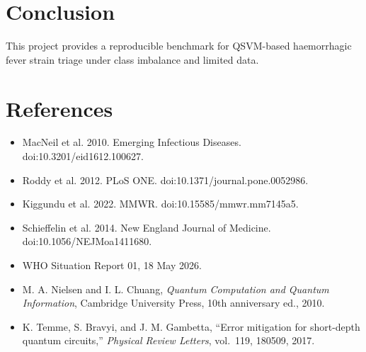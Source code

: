 \documentclass[11pt]{article}
\begin{document}
\section{Conclusion}
This project provides a reproducible benchmark for QSVM-based haemorrhagic fever strain triage under class imbalance and limited data.

\section*{References}
\begin{itemize}
\item MacNeil et al. 2010. Emerging Infectious Diseases. doi:10.3201/eid1612.100627.
\item Roddy et al. 2012. PLoS ONE. doi:10.1371/journal.pone.0052986.
\item Kiggundu et al. 2022. MMWR. doi:10.15585/mmwr.mm7145a5.
\item Schieffelin et al. 2014. New England Journal of Medicine. doi:10.1056/NEJMoa1411680.
\item WHO Situation Report 01, 18 May 2026.
\item M. A. Nielsen and I. L. Chuang, \emph{Quantum Computation and Quantum Information}, Cambridge University Press, 10th anniversary ed., 2010. \label{nielsen2010}
\item K. Temme, S. Bravyi, and J. M. Gambetta, ``Error mitigation for short-depth quantum circuits,'' \emph{Physical Review Letters}, vol.~119, 180509, 2017. \label{temme2017}
\end{itemize}
\end{document}
